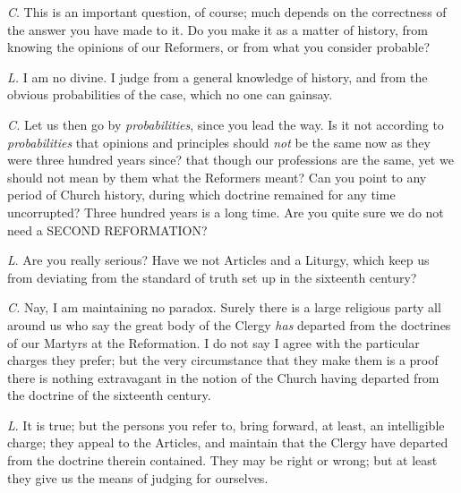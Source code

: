 \emph{C}.
This is an important question, of course; much depends on the
correctness of the answer you have made to it. Do you make it as a
matter of history, from knowing the opinions of our Reformers, or from
what you consider probable?

\emph{L.}
I am no divine. I judge from a general knowledge of
history, and from the obvious probabilities of the case, which no one
can gainsay.

\emph{C.}
Let us then go by \emph{probabilities}, since you lead the way. Is it not according to \emph{probabilities} that opinions and principles should \emph{not} be the same now
as they were three hundred years since? that though our professions
are the same, yet we should not mean by them what the Reformers meant?
Can you point to any period of Church history, during which doctrine
remained for any time uncorrupted? Three hundred years is a long time.
Are you quite sure we do not need a SECOND
REFORMATION?

\emph{L}.
Are you really serious? Have we not Articles and a Liturgy,
which keep us from deviating from the standard of truth set up in the
sixteenth century?

\emph{C.}
Nay, I am maintaining no paradox. Surely there is a large
religious party all around us who say the great body of the Clergy \emph{has} departed from the doctrines of our Martyrs at the Reformation. I
do not say I agree with the particular charges they prefer; but the
very circumstance that they make them is a proof there is nothing
extravagant in the notion of the Church having departed from the
doctrine of the sixteenth century.

\emph{L}.
It is true; but the persons you refer to, bring forward, at
least, an intelligible charge; they appeal to the Articles, and
maintain that the Clergy have departed from the doctrine therein
contained. They may be right or wrong; but at least they give us the
means of judging for ourselves.

